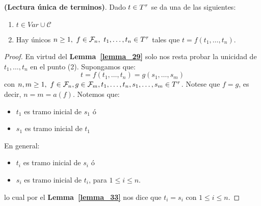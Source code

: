   \begin{theorem} \label{lemma_34}
    \PN \textbf{(Lectura única de terminos)}. Dado $t \in T^{\tau}$ se da una de las siguientes:
    \begin{enumerate}[(1)]
      \item $t \in Var \cup \mathcal{C}$
      \item Hay únicos $n \geq 1, \ f \in \mathcal{F}_{n}, \ t_{1}, \dotsc, t_{n} \in T^{\tau}$ tales que $t = f(t_{1},
        \dotsc, t_{n})$.
    \end{enumerate}
  \end{theorem}
  \begin{proof}
    \PN En virtud del \textbf{Lemma~\ref{lemma_29}} solo nos resta probar la unicidad de $t_{1}, \dotsc, t_{n}$ en el
    punto (2). Supongamos que:
    \[
      t = f(t_{1}, \dotsc, t_{n}) = g(s_{1}, \dotsc, s_{m})
    \]
    \PN con $n, m \geq 1, \ f \in \mathcal{F}_{n}, g \in \mathcal{F}_{m}, t_{1}, \dotsc, t_{n}, s_{1}, \dotsc, s_{m} \in
    T^{\tau}$. Notese que $f = g$, es decir, $n = m = a(f)$. Notemos que:
    \begin{itemize}
      \item $t_{1}$ es tramo inicial de $s_{1}$ ó
      \item $s_{1}$ es tramo inicial de $t_{1}$
    \end{itemize}

    \PN En general:
    \begin{itemize}
      \item $t_{i}$ es tramo inicial de $s_{i}$ ó
      \item $s_{i}$ es tramo inicial de $t_{i}$, para $1 \leq i \leq n$.
    \end{itemize}


    \PN lo cual por el \textbf{Lemma~\ref{lemma_33}} nos dice que $t_{i} = s_{i}$ con $1 \leq i \leq n$.
  \end{proof}

